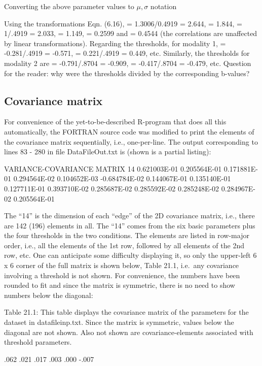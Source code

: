 \documentclass[
]{book}
\begin{document}
Converting the above parameter values to \(\mu, \sigma\) notation

Using the transformations Eqn. (6.16), = 1.3006/0.4919 = 2.644, = 1.844, = 1/.4919 = 2.033, = 1.149, = 0.2599 and = 0.4544 (the correlations are unaffected by linear transformations). Regarding the thresholds, for modality 1, = -0.281/.4919 = -0.571, = 0.221/.4919 = 0.449, etc. Similarly, the thresholds for modality 2 are = -0.791/.8704 = -0.909, = -0.417/.8704 = -0.479, etc. Question for the reader: why were the thresholds divided by the corresponding b-values?

\hypertarget{bivariate-binormal-model-corroc2-covariance-matrix}{%
\subsection{Covariance matrix}\label{bivariate-binormal-model-corroc2-covariance-matrix}}

For convenience of the yet-to-be-described R-program that does all this automatically, the FORTRAN source code was modified to print the elements of the covariance matrix sequentially, i.e., one-per-line. The output corresponding to lines 83 - 280 in file DataFileOut.txt is (shown is a partial listing):

VARIANCE-COVARIANCE MATRIX
14
0.621003E-01
0.205564E-01
0.171881E-01
0.294564E-02
0.104652E-03
-0.684784E-02
0.144067E-01
0.135140E-01
0.127711E-01
0.393710E-02
0.285687E-02
0.285592E-02
0.285248E-02
0.284967E-02
0.205564E-01

The ``14'' is the dimension of each ``edge'' of the 2D covariance matrix, i.e., there are 142 (196) elements in all. The ``14'' comes from the six basic parameters plus the four thresholds in the two conditions. The elements are listed in row-major order, i.e., all the elements of the 1st row, followed by all elements of the 2nd row, etc. One can anticipate some difficulty displaying it, so only the upper-left 6 x 6 corner of the full matrix is shown below, Table 21.1, i.e.~any covariance involving a threshold is not shown. For convenience, the numbers have been rounded to fit and since the matrix is symmetric, there is no need to show numbers below the diagonal:

Table 21.1: This table displays the covariance matrix of the parameters for the dataset in datafileinp.txt. Since the matrix is symmetric, values below the diagonal are not shown. Also not shown are covariance-elements associated with threshold parameters.

.062 .021 .017 .003 .000 -.007
\end{document}
